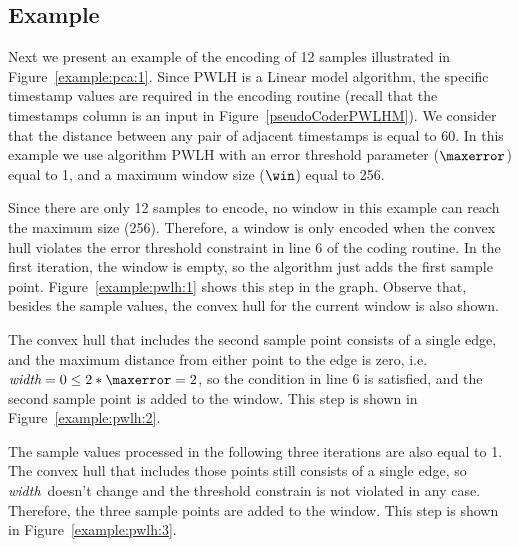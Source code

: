 




\subsection{Example}
\label{algo:pwlh:example}


Next we present an example of the encoding of 12 samples illustrated in Figure~\ref{example:pca:1}. Since PWLH is a Linear model algorithm, the specific timestamp values are required in the encoding routine (recall that the timestamps column is an input in Figure~\ref{pseudoCoderPWLHM}). We consider that the distance between any pair of adjacent timestamps is equal to 60. In this example we use algorithm PWLH with an error threshold parameter ($\maxerror$) equal to 1, and a maximum window size ($\win$) equal to 256.


\clearpage


Since there are only 12 samples to encode, no window in this example can reach the maximum size (256). Therefore, a window is only encoded when the convex hull violates the error threshold constraint in line 6 of the coding routine. In the first iteration, the window is empty, so the algorithm just adds the first sample point. Figure~\ref{example:pwlh:1} shows this step in the graph. Observe that, besides the sample values, the convex hull for the current window is also shown.




\newcommand{\widthh}{\textit{width}}
The convex hull that includes the second sample point consists of a single edge, and the maximum distance from either point to the edge is zero, i.e. $\widthh = 0 \leq 2*\maxerror = 2$, so the condition in line 6 is satisfied, and the second sample point is added to the window. This step is shown in Figure~\ref{example:pwlh:2}.




\clearpage


The sample values processed in the following three iterations are also equal to 1. The convex hull that includes those points still consists of a single edge, so \widthh\ doesn't change and the threshold constrain is not violated in any case. Therefore, the three sample points are added to the window. This step is shown in Figure~\ref{example:pwlh:3}.


